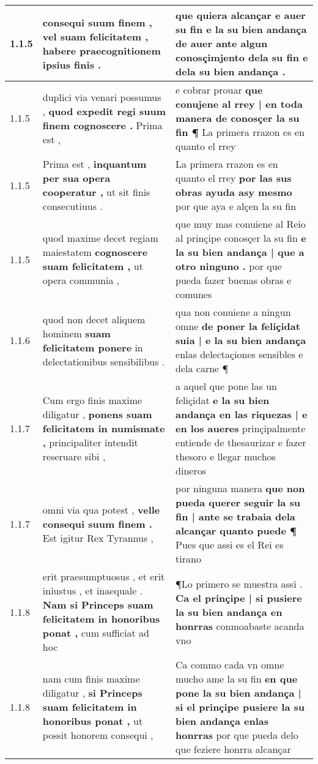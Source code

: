 \begin{tabular}{|p{1cm}|p{6.5cm}|p{6.5cm}|}

\hline
1.1.5 & consequi suum finem , \textbf{ vel suam felicitatem , } habere praecognitionem ipsius finis . & que quiera alcançar e auer su fin \textbf{ e la su bien andança de auer } ante algun conosçimjento dela su fin e dela su bien andança . \\\hline
1.1.5 & duplici via venari possumus , \textbf{ quod expedit regi suum finem cognoscere . } Prima est , & e cobrar prouar \textbf{ que conujene al rrey | en toda manera de conosçer la su fin ¶ } La primera rrazon es en quanto el rrey \\\hline
1.1.5 & Prima est , \textbf{ inquantum per sua opera cooperatur , } ut sit finis consecutiuus . & La primera rrazon es en quanto el rrey \textbf{ por las sus obras ayuda asy mesmo } por que aya e alçen la su fin \\\hline
1.1.5 & quod maxime decet regiam maiestatem \textbf{ cognoscere suam felicitatem , } ut opera communia , & que muy mas conuiene al Reio al prinçipe conosçer la su fin \textbf{ e la su bien andança | que a otro ninguno . } por que pueda fazer buenas obras e comunes \\\hline
1.1.6 & quod non decet aliquem hominem \textbf{ suam felicitatem ponere } in delectationibus sensibilibus . & qua non conuiene a ningun omne \textbf{ de poner la feliçidat suia | e la su bien andança } enlas delectaçiones sensibles e dela carne ¶ \\\hline
1.1.7 & Cum ergo finis maxime diligatur , \textbf{ ponens suam felicitatem in numismate , } principaliter intendit reseruare sibi , & a aquel que pone las un feliçidat \textbf{ e la su bien andança en las riquezas | e en los aueres } prinçipalmente entiende de thesaurizar e fazer thesoro e llegar muchos dineros \\\hline
1.1.7 & omni via qua potest , \textbf{ velle consequi suum finem . } Est igitur Rex Tyrannus , & por ninguna manera \textbf{ que non pueda querer seguir la su fin | ante se trabaia dela alcançar quanto puede ¶ } Pues que assi es el Rei es tirano \\\hline
1.1.8 & erit praesumptuosus , et erit iniustus , et inaequale . \textbf{ Nam si Princeps suam felicitatem in honoribus ponat , } cum sufficiat ad hoc & ¶Lo primero se muestra assi . \textbf{ Ca el prinçipe | si pusiere la su bien andança en honrras } conmoabaste acanda vno \\\hline
1.1.8 & nam cum finis maxime diligatur , \textbf{ si Princeps suam felicitatem in honoribus ponat , } ut possit honorem consequi , & Ca commo cada vn omne mucho ame la su fin \textbf{ en que pone la su bien andança | si el prinçipe pusiere la su bien andança enlas honrras } por que pueda delo que feziere honrra alcançar \\\hline

\end{tabular}
